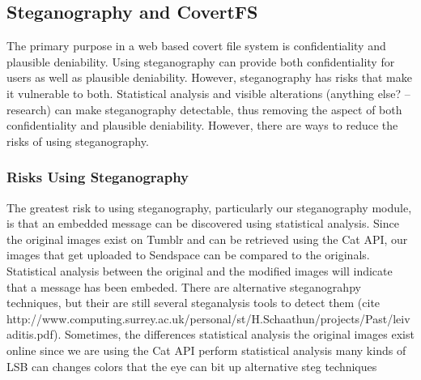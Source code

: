 \subsection{Steganography and CovertFS}
The primary purpose in a web based covert file system is confidentiality and plausible deniability. Using steganography can provide both confidentiality for users as well as plausible deniability. However, steganography has risks that make it vulnerable to both. Statistical analysis and visible alterations (anything else? -- research) can make steganography detectable, thus removing the aspect of both confidentiality and plausible deniability. However, there are ways to reduce the risks of using steganography. 

\subsubsection{Risks Using Steganography}
The greatest risk to using steganography, particularly our steganography module, is that an embedded message can be discovered using statistical analysis. Since the original images exist on Tumblr and can be retrieved using the Cat API, our images that get uploaded to Sendspace can be compared to the originals. Statistical analysis between the original and the modified images will indicate that a message has been embeded. There are alternative steganograhpy techniques, but their are still several steganalysis tools to detect them (cite http://www.computing.surrey.ac.uk/personal/st/H.Schaathun/projects/Past/leivaditis.pdf).
Sometimes, the differences 
statistical analysis
		the original images exist online since we are using the Cat API
		perform statistical analysis
	many kinds of LSB can changes colors that the eye can bit up
	alternative steg techniques

